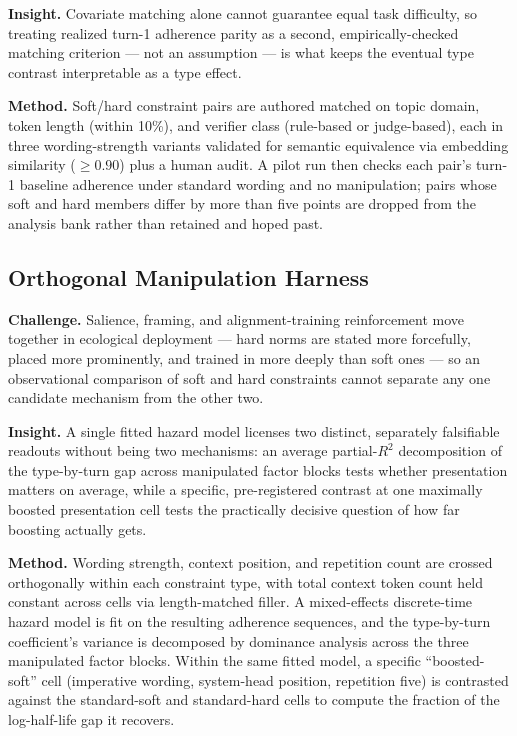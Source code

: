 \documentclass[11pt]{article}
\begin{document}
\textbf{Insight.} Covariate matching alone cannot guarantee equal task difficulty, so treating realized turn-1 adherence parity as a second, empirically-checked matching criterion --- not an assumption --- is what keeps the eventual type contrast interpretable as a type effect.

\textbf{Method.} Soft/hard constraint pairs are authored matched on topic domain, token length (within 10\%), and verifier class (rule-based or judge-based), each in three wording-strength variants validated for semantic equivalence via embedding similarity ($\geq 0.90$) plus a human audit. A pilot run then checks each pair's turn-1 baseline adherence under standard wording and no manipulation; pairs whose soft and hard members differ by more than five points are dropped from the analysis bank rather than retained and hoped past.

\subsection{Orthogonal Manipulation Harness}
\textbf{Challenge.} Salience, framing, and alignment-training reinforcement move together in ecological deployment --- hard norms are stated more forcefully, placed more prominently, and trained in more deeply than soft ones --- so an observational comparison of soft and hard constraints cannot separate any one candidate mechanism from the other two.

\textbf{Insight.} A single fitted hazard model licenses two distinct, separately falsifiable readouts without being two mechanisms: an average partial-$R^2$ decomposition of the type-by-turn gap across manipulated factor blocks tests whether presentation matters on average, while a specific, pre-registered contrast at one maximally boosted presentation cell tests the practically decisive question of how far boosting actually gets.

\textbf{Method.} Wording strength, context position, and repetition count are crossed orthogonally within each constraint type, with total context token count held constant across cells via length-matched filler. A mixed-effects discrete-time hazard model is fit on the resulting adherence sequences, and the type-by-turn coefficient's variance is decomposed by dominance analysis across the three manipulated factor blocks. Within the same fitted model, a specific ``boosted-soft'' cell (imperative wording, system-head position, repetition five) is contrasted against the standard-soft and standard-hard cells to compute the fraction of the log-half-life gap it recovers.
\end{document}
